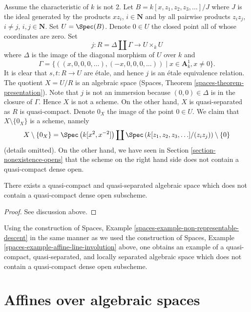 \medskip\noindent
Assume the characteristic of $k$ is not 2.
Let $B = k[x, z_1, z_2, z_3, \ldots]/J$ where $J$ is the ideal generated by
the products $xz_i$, $i \in \mathbf{N}$ and by all pairwise products
$z_iz_j$, $i \not = j$, $i, j \in \mathbf{N}$. Set $U = \Spec(B)$.
Denote $0 \in U$ the closed point all of whose coordinates are zero.
Set
$$
j : R = \Delta \coprod \Gamma \longrightarrow U \times_k U
$$
where $\Delta$ is the image of the diagonal morphism of $U$ over $k$ and
$$
\Gamma = \{((x, 0, 0, 0, \ldots), (-x, 0, 0, 0, \ldots))
\mid x \in \mathbf{A}^1_k, x \not = 0\}.
$$
It is clear that $s, t : R \to U$ are \'etale, and hence
$j$ is an \'etale equivalence relation. The quotient $X = U/R$
is an algebraic space (Spaces, Theorem \ref{spaces-theorem-presentation}).
Note that $j$ is not an immersion because
$(0, 0) \in \Delta$ is in the closure of $\Gamma$.
Hence $X$ is not a scheme. On the other hand, $X$ is quasi-separated
as $R$ is quasi-compact. Denote $0_X$ the image of the point $0 \in U$.
We claim that $X \setminus \{0_X\}$ is a scheme, namely
$$
X \setminus \{0_X\} =
\Spec\left(k[x^2, x^{-2}]\right) \coprod
\Spec\left(k[z_1, z_2, z_3, \ldots]/(z_iz_j)\right) \setminus \{0\}
$$
(details omitted). On the other hand, we have seen in
Section \ref{section-nonexistence-opens} that the scheme
on the right hand side does not contain
a quasi-compact dense open.

\begin{lemma}
\label{lemma-nonexistence-qc-dense-open-subscheme}
There exists a quasi-compact and quasi-separated algebraic space
which does not contain a quasi-compact dense open subscheme.
\end{lemma}

\begin{proof}
See discussion above.
\end{proof}

\noindent
Using the construction of 
Spaces, Example \ref{spaces-example-non-representable-descent}
in the same manner as we used the construction of
Spaces, Example \ref{spaces-example-affine-line-involution}
above, one obtains an example of a quasi-compact, quasi-separated, and
locally separated algebraic space which does not contain a quasi-compact
dense open subscheme.


\section{Affines over algebraic spaces}
\label{section-embedding-affines}

